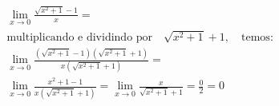 \begin{ex}
\begin{align}
&\lim_{x\rightarrow 0} \frac{\sqrt{x^2+1}-1}{x}=\nonumber\\
&\text{multiplicando e dividindo por}\quad \sqrt{x^2+1}+1,\quad\text{temos:}\nonumber\\
&\lim_{x\rightarrow 0} \frac{(\sqrt{x^2+1}-1)(\sqrt{x^2+1}+1)}{x(\sqrt{x^2+1}+1)}=\nonumber\\
&\lim_{x\rightarrow 0} \frac{x^2+1-1}{x(\sqrt{x^2+1}+1)}=\lim_{x\rightarrow 0} \frac{x}{\sqrt{x^2+1}+1}=\frac{0}{2}=0\nonumber
\end{align}
\end{ex}